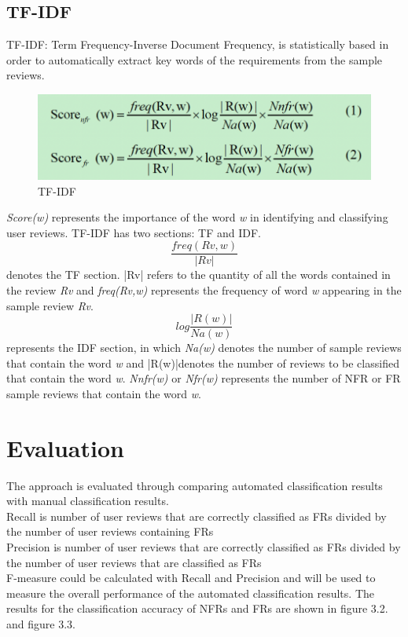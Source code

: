 \subsection{TF-IDF}
TF-IDF: Term Frequency-Inverse Document Frequency, is statistically based in order to automatically extract key words of the requirements from the sample reviews. 

\begin{figure}[H] 
\centering
\includegraphics[scale=0.8]{../images/Thema1_TF_IDF.png}
\caption{TF-IDF}
\label{fig:model}
\end{figure}

\emph{Score(w)} represents the importance of the word \emph{w} in identifying and classifying user reviews.
TF-IDF has two sections: TF and IDF.
$$\frac{freq(Rv,w)}{|Rv|}$$ denotes the TF section. {|Rv|} refers to the quantity of all the words contained in the review \emph{Rv} and \emph{freq(Rv,w)} represents the frequency of word \emph{w} appearing in the sample review \emph{Rv}.
$$log\frac{|R(w)|}{Na(w)}$$ represents the IDF section, in which \emph{Na(w)} denotes the number of sample reviews that contain the word \emph{w} and |R(w)|denotes the number of reviews to be classified that contain the word \emph{w}. \emph{Nnfr(w)} or \emph{Nfr(w)} represents the number of NFR or FR sample reviews that contain the word \emph{w}.

\section{Evaluation}
The approach is evaluated through comparing automated classification results with manual classification results. \\
Recall is number of user reviews that are correctly classified as FRs divided by the number of user reviews containing FRs\\
Precision is number of user reviews that are correctly classified as FRs divided by the number of user reviews that are classified as FRs\\
F-measure could be calculated with Recall and Precision and will be used to measure the overall performance of the automated classification results. The results for the classification accuracy of NFRs and FRs are shown in figure 3.2. and figure 3.3. \\

